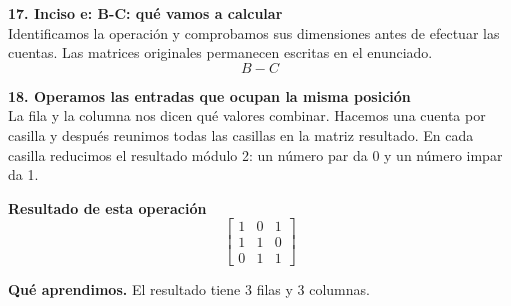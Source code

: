 \documentclass[11pt,a4paper,landscape]{article}
\begin{document}
\noindent\begin{minipage}{\linewidth}\textbf{17. Inciso e: B-C: qué vamos a calcular}\\[2pt]Identificamos la operación y comprobamos sus dimensiones antes de efectuar las cuentas. Las matrices originales permanecen escritas en el enunciado.
\[B-C\]
\end{minipage}\par\medskip
\noindent\begin{minipage}{\linewidth}\textbf{18. Operamos las entradas que ocupan la misma posición}\\[2pt]La fila y la columna nos dicen qué valores combinar. Hacemos una cuenta por casilla y después reunimos todas las casillas en la matriz resultado. En cada casilla reducimos el resultado módulo 2: un número par da 0 y un número impar da 1.
\par{}\par\smallskip
\par\smallskip \textbf{Resultado de esta operación}\[\begin{bmatrix}1 & 0 & 1\\1 & 1 & 0\\0 & 1 & 1\end{bmatrix}\]
\par\smallskip\textbf{Qué aprendimos.} El resultado tiene 3 filas y 3 columnas.
\end{minipage}\par\medskip
\end{document}
